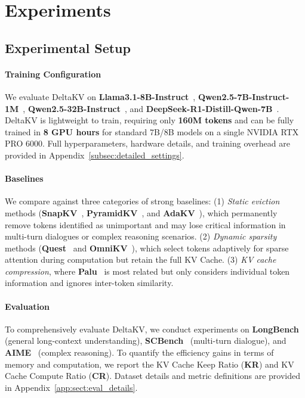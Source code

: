 \section{Experiments}
\label{sec:expt}



\subsection{Experimental Setup}
\label{sec:expt:setup}

\paragraph{Training Configuration}
We evaluate DeltaKV on \textbf{Llama3.1-8B-Instruct}~\cite{grattafiori2024llama3}, \textbf{Qwen2.5-7B-Instruct-1M}~\cite{yang2025qwen2_1m}, \textbf{Qwen2.5-32B-Instruct}~\cite{team2024qwen2}, and \textbf{DeepSeek-R1-Distill-Qwen-7B}~\cite{guo2025deepseekr1}. 
DeltaKV is lightweight to train, requiring only \textbf{160M tokens} and can be fully trained in \textbf{8 GPU hours} for standard 7B/8B models on a single NVIDIA RTX PRO 6000.
Full hyperparameters, hardware details, and training overhead are provided in Appendix~\ref{subsec:detailed_settings}.

\paragraph{Baselines}
We compare against three categories of strong baselines:
(1) \textit{Static eviction} methods (\textbf{SnapKV}~\cite{li2024snapkv}, \textbf{PyramidKV}~\cite{cai2024pyramidkv}, and \textbf{AdaKV}~\cite{feng2025adakv}), which permanently remove tokens identified as unimportant and may lose critical information in multi-turn dialogues or complex reasoning scenarios. 
(2) \textit{Dynamic sparsity} methods (\textbf{Quest}~\cite{tang2024quest} and \textbf{OmniKV}~\cite{hao2025omnikv}), which select tokens adaptively for sparse attention during computation but retain the full KV Cache. 
(3) \textit{KV cache compression}, where \textbf{Palu}~\cite{chang2025palu} is most related but only considers individual token information and ignores inter-token similarity. 

\paragraph{Evaluation}
To comprehensively evaluate DeltaKV, we conduct experiments on \textbf{LongBench}~\cite{bai2024longbench} (general long-context understanding), \textbf{SCBench}~\cite{li2024scbench} (multi-turn dialogue), and \textbf{AIME}~\cite{maa_aime} (complex reasoning). 
To quantify the efficiency gains in terms of memory and computation, we report the KV Cache Keep Ratio (\textbf{KR}) and KV Cache Compute Ratio (\textbf{CR}). 
Dataset details and metric definitions are provided in Appendix~\ref{app:sect:eval_details}.
\vspace{-0.25em}

